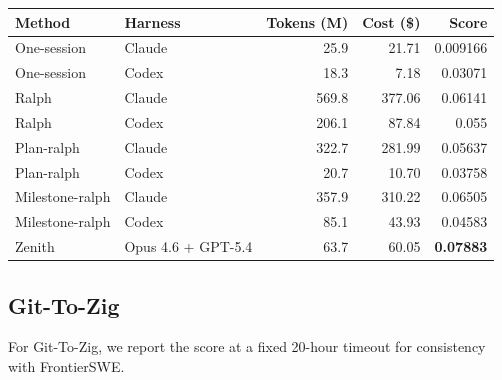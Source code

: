 \documentclass[11pt,a4paper]{article}
\newcommand{\code}[1]{#1}
\begin{document}
\noindent\begin{tabular}{@{}llrrr@{}}
\toprule
\rowcolor{tablehead}\textbf{\color{white}Method} & \textbf{\color{white}Harness} & \textbf{\color{white}Tokens (M)} & \textbf{\color{white}Cost (\$)} & \textbf{\color{white}Score} \\
\midrule
\code{One-session}    & Claude              & 25.9 & 21.71  & 0.009166 \\
\rowcolor{tableband}
\code{One-session}    & Codex               & 18.3 & 7.18   & 0.03071 \\
\code{Ralph}          & Claude              & 569.8 & 377.06 & 0.06141 \\
\rowcolor{tableband}
\code{Ralph}          & Codex               & 206.1 & 87.84  & 0.055 \\
\code{Plan-ralph}     & Claude              & 322.7 & 281.99 & 0.05637 \\
\rowcolor{tableband}
\code{Plan-ralph}     & Codex               & 20.7  & 10.70  & 0.03758 \\
\code{Milestone-ralph}& Claude              & 357.9 & 310.22 & 0.06505 \\
\rowcolor{tableband}
\code{Milestone-ralph}& Codex               & 85.1  & 43.93  & 0.04583 \\
\code{Zenith}         & Opus 4.6 + GPT-5.4  & 63.7  & 60.05  & \textbf{0.07883} \\
\bottomrule
\end{tabular}

\subsection*{Git-To-Zig}

For Git-To-Zig, we report the score at a fixed 20-hour timeout for consistency with FrontierSWE.
\end{document}
